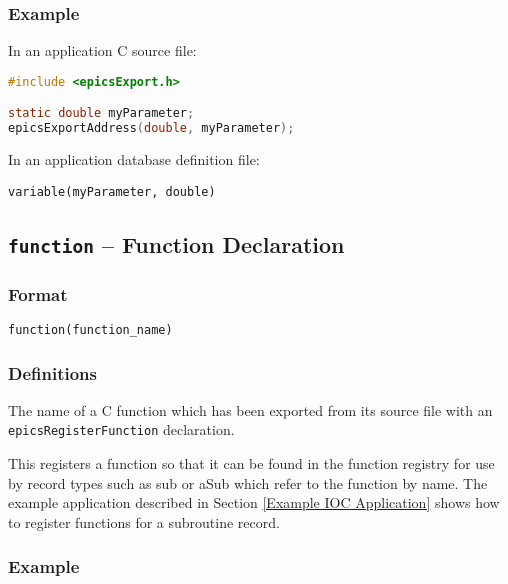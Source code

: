\subsubsection{Example}

In an application C source file:

\begin{lstlisting}[language=C]
#include <epicsExport.h>

static double myParameter;
epicsExportAddress(double, myParameter);
\end{lstlisting}

In an application database definition file:

\begin{verbatim}
variable(myParameter, double)
\end{verbatim}

\subsection{\texttt{function} -- Function Declaration}

\subsubsection{Format}

\begin{verbatim}
function(function_name)
\end{verbatim}

\subsubsection{Definitions}

\begin{description}
\item [function\_name] The name of a C function which has been exported from its source file with an
\verb|epicsRegisterFunction| declaration.
\end{description}

This registers a function so that it can be found in the function registry for use by record types such as sub or aSub which refer to the function by name.
The example application described in Section \ref{Example IOC Application} shows how to register functions for a subroutine record.

\subsubsection{Example}

